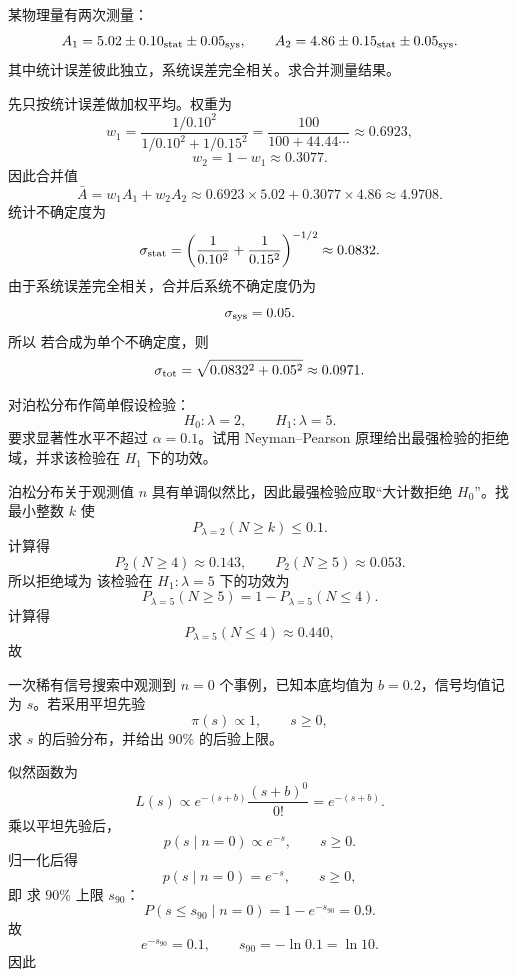 \begin{question}
某物理量有两次测量：
\[
A_1=5.02\pm0.10_{\rm stat}\pm0.05_{\rm sys},
\qquad
A_2=4.86\pm0.15_{\rm stat}\pm0.05_{\rm sys}.
\]
其中统计误差彼此独立，系统误差完全相关。求合并测量结果。
\begin{solution}
先只按统计误差做加权平均。权重为
\[
w_1=\frac{1/0.10^2}{1/0.10^2+1/0.15^2}
=\frac{100}{100+44.44\cdots}\approx 0.6923,
\]
\[
w_2=1-w_1\approx 0.3077.
\]
因此合并值
\[
\bar A=w_1A_1+w_2A_2
\approx 0.6923\times 5.02+0.3077\times 4.86
\approx 4.9708.
\]
统计不确定度为
\[
\sigma_{\rm stat}
=\left(\frac1{0.10^2}+\frac1{0.15^2}\right)^{-1/2}
\approx 0.0832.
\]
由于系统误差完全相关，合并后系统不确定度仍为
\[
\sigma_{\rm sys}=0.05.
\]
所以
若合成为单个不确定度，则
\[
\sigma_{\rm tot}=\sqrt{0.0832^2+0.05^2}\approx 0.0971.
\]
\end{solution}
\end{question}

\begin{question}
对泊松分布作简单假设检验：
\[
H_0:\lambda=2,\qquad H_1:\lambda=5.
\]
要求显著性水平不超过 $\alpha=0.1$。试用 Neyman--Pearson 原理给出最强检验的拒绝域，并求该检验在 $H_1$ 下的功效。
\begin{solution}
泊松分布关于观测值 $n$ 具有单调似然比，因此最强检验应取“大计数拒绝 $H_0$”。找最小整数 $k$ 使
\[
P_{\lambda=2}(N\ge k)\le 0.1.
\]
计算得
\[
P_{2}(N\ge 4)\approx 0.143,\qquad P_{2}(N\ge 5)\approx 0.053.
\]
所以拒绝域为
该检验在 $H_1:\lambda=5$ 下的功效为
\[
P_{\lambda=5}(N\ge 5)=1-P_{\lambda=5}(N\le 4).
\]
计算得
\[
P_{\lambda=5}(N\le 4)\approx 0.440,
\]
故
\end{solution}
\end{question}

\begin{question}
一次稀有信号搜索中观测到 $n=0$ 个事例，已知本底均值为 $b=0.2$，信号均值记为 $s$。若采用平坦先验
\[
\pi(s)\propto 1,\qquad s\ge 0,
\]
求 $s$ 的后验分布，并给出 $90\%$ 的后验上限。
\begin{solution}
似然函数为
\[
L(s)\propto e^{-(s+b)}\frac{(s+b)^0}{0!}=e^{-(s+b)}.
\]
乘以平坦先验后，
\[
p(s\mid n=0)\propto e^{-s},\qquad s\ge 0.
\]
归一化后得
\[
p(s\mid n=0)=e^{-s},\qquad s\ge 0,
\]
即
求 $90\%$ 上限 $s_{90}$：
\[
P(s\le s_{90}\mid n=0)=1-e^{-s_{90}}=0.9.
\]
故
\[
e^{-s_{90}}=0.1,\qquad s_{90}=-\ln 0.1=\ln 10.
\]
因此
\end{solution}
\end{question}

